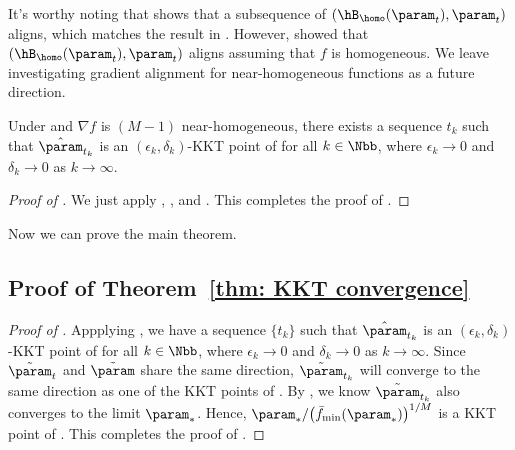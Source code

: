 It's worthy noting that  shows that  a subsequence of $(\hB_{\homo}(\param_t), \param_t)$ aligns, which matches the result in \citet{lyu2020gradient}. However, \citet{ji2020directional} showed that $(\hB_{\homo}(\param_t), \param_t)$ aligns assuming that $f$ is homogeneous. We leave investigating gradient alignment for near-homogeneous functions as a future direction.

\begin{lemma}
    \label{lem: approx kkT}
    Under  and $\nabla f$ is $(M-1)$ near-homogeneous, there exists a sequence $t_k$ such that $\hat \param_{t_k}$ is an $(\epsilon_k, \delta_k)$-KKT point of  for all $k\in \Nbb$, where $\epsilon_k \to 0$ and $\delta_k \to 0$ as $k\to \infty$.
\end{lemma}
\begin{proof}[Proof of ]
We just apply , , and . This completes the proof of .
\end{proof}
Now we can prove the main theorem.

\subsection{Proof of Theorem~\ref{thm: KKT convergence}}

\begin{proof}[Proof of ] 


Appplying , we have a sequence $\{t_k\}$ such that $\hat \param_{t_k}$ is an $(\epsilon_k, \delta_k)$-KKT point of  for all $k\in \Nbb$, where $\epsilon_k \to 0$ and $\delta_k \to 0$ as $k\to \infty$.  Since $\tilde \param_t$ and $\tilde{\param} $ share the same direction, $\tilde{\param}_{t_k}$ will converge to the same direction as one of the KKT points of .  By , we know $\tilde{\param}_{t_k}$ also converges to the limit $\param_*$. Hence, $\param_*/\big(\bar f_{\min}(\param_*)\big)^{1/M}$ is a KKT point of . This completes the proof of . 
\end{proof}

